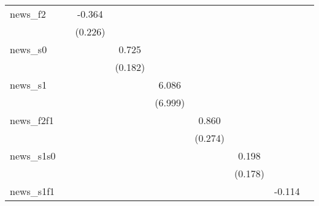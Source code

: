 {\begin{tabular}{l*{8}{c}}
\addlinespace
news\_f2     &                     &      -0.364         &                     &                     &                     &                     &                     &                     \\
            &                     &     (0.226)         &                     &                     &                     &                     &                     &                     \\
\addlinespace
news\_s0     &                     &                     &       0.725\sym{***}&                     &                     &                     &                     &                     \\
            &                     &                     &     (0.182)         &                     &                     &                     &                     &                     \\
\addlinespace
news\_s1     &                     &                     &                     &       6.086         &                     &                     &                     &                     \\
            &                     &                     &                     &     (6.999)         &                     &                     &                     &                     \\
\addlinespace
news\_f2f1   &                     &                     &                     &                     &       0.860\sym{***}&                     &                     &                     \\
            &                     &                     &                     &                     &     (0.274)         &                     &                     &                     \\
\addlinespace
news\_s1s0   &                     &                     &                     &                     &                     &       0.198         &                     &                     \\
            &                     &                     &                     &                     &                     &     (0.178)         &                     &                     \\
\addlinespace
news\_s1f1   &                     &                     &                     &                     &                     &                     &      -0.114         &                     \\

\end{tabular}}
